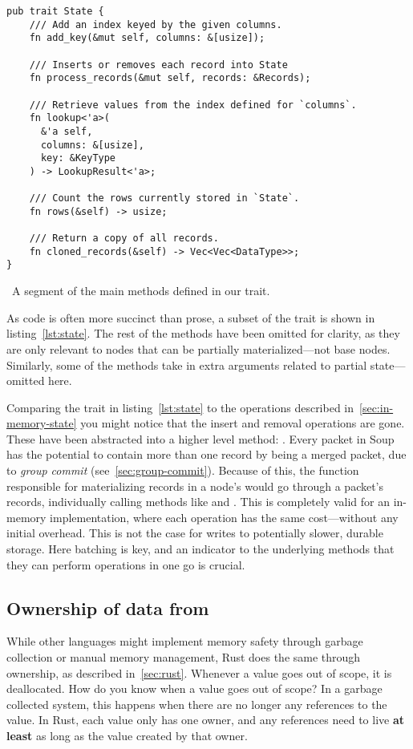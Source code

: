 \begin{listing}[H]
  \begin{verbatim}
pub trait State {
    /// Add an index keyed by the given columns.
    fn add_key(&mut self, columns: &[usize]);

    /// Inserts or removes each record into State
    fn process_records(&mut self, records: &Records);

    /// Retrieve values from the index defined for `columns`.
    fn lookup<'a>(
      &'a self,
      columns: &[usize],
      key: &KeyType
    ) -> LookupResult<'a>;

    /// Count the rows currently stored in `State`.
    fn rows(&self) -> usize;

    /// Return a copy of all records.
    fn cloned_records(&self) -> Vec<Vec<DataType>>;
}
  \end{verbatim}

  \caption{\
    A segment of the main methods defined in our  trait.
  }\label{lst:state}
\end{listing}

As code is often more succinct than prose, a subset of the  trait is
shown in listing~\ref{lst:state}. The rest of the methods have been omitted for
clarity, as they are only relevant to nodes that can be partially
materialized---not base nodes. Similarly, some of the methods take in extra
arguments related to partial state---omitted here.

Comparing the trait in listing~\ref{lst:state} to the operations described
in~\ref{sec:in-memory-state} you might notice that the insert and removal
operations are gone. These have been abstracted into a higher level method:
\code{process\_records}. Every packet in Soup has the potential to contain more
than one record by being a merged packet, due to \textit{group commit}
(see~\ref{sec:group-commit}). Because of this, the function responsible for
materializing records in a node's \code{State} would go through a packet's
records, individually calling methods like \code{State::insert} and
\code{State::remove}. This is completely valid for an in-memory implementation,
where each operation has the same cost---without any initial overhead. This is
not the case for writes to potentially slower, durable storage. Here batching is
key, and an indicator to the underlying methods that they can perform operations
in one go is crucial.

\subsection{Ownership of data from }
While other languages might implement memory safety through garbage collection
or manual memory management, Rust does the same through ownership, as described
in~\ref{sec:rust}. Whenever a value goes out of scope, it is deallocated. How
do you know when a value goes out of scope? In a garbage collected system, this
happens when there are no longer any references to the value. In Rust, each
value only has one owner, and any references need to live \textbf{at least} as
long as the value created by that owner.

